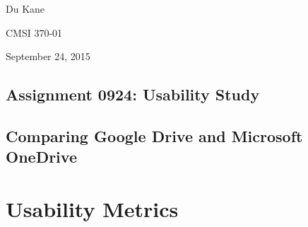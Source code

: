 \documentclass[a4paper,12pt]{article}
\begin{document}
Du Kane

CMSI 370-01

September 24, 2015

\begin{center}
\section*{Assignment 0924: Usability Study}
\subsection*{Comparing Google Drive and Microsoft OneDrive}
\end{center}

\section{Usability Metrics}
\end{document}
